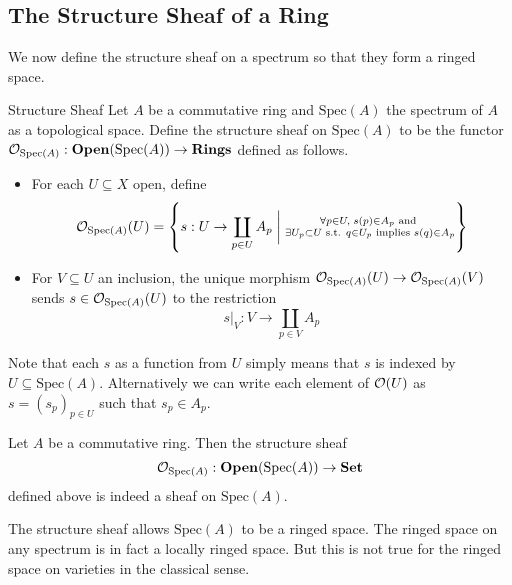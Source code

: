\documentclass[a4paper]{article}
\begin{document}
\subsection{The Structure Sheaf of a Ring}
We now define the structure sheaf on a spectrum so that they form a ringed space. 

\begin{defn}{Structure Sheaf}{} Let $A$ be a commutative ring and $\text{Spec}(A)$ the spectrum of $A$ as a topological space. Define the structure sheaf on $\text{Spec}(A)$ to be the functor $\mathcal{O}_{\text{Spec}(A)}:\bold{Open}(\text{Spec}(A))\to\bold{Rings}$ defined as follows. 
\begin{itemize}
\item For each $U\subseteq X$ open, define $$\mathcal{O}_{\text{Spec}(A)}(U)=\left\{s:U\to\coprod_{p\in U}A_p\;\bigg{|}\;\substack{\forall p\in U,\;s(p)\in A_p\text{ and }\\\exists U_p\subset U\text{ s.t. }q\in U_p\text{ implies }s(q)\in A_p}\right\}$$
\item For $V\subseteq U$ an inclusion, the unique morphism $\mathcal{O}_{\text{Spec}(A)}(U)\to\mathcal{O}_{\text{Spec}(A)}(V)$ sends $s\in\mathcal{O}_{\text{Spec}(A)}(U)$ to the restriction $$s|_V:V\to\coprod_{p\in V}A_p$$
\end{itemize}
\end{defn}

Note that each $s$ as a function from $U$ simply means that $s$ is indexed by $U\subseteq\text{Spec}(A)$. Alternatively we can write each element of $\mathcal{O}(U)$ as $s=(s_p)_{p\in U}$ such that $s_p\in A_p$. 

\begin{thm}{}{} Let $A$ be a commutative ring. Then the structure sheaf $$\mathcal{O}_{\text{Spec}(A)}:\bold{Open}(\text{Spec}(A))\to\bold{Set}$$ defined above is indeed a sheaf on $\text{Spec}(A)$. 
\end{thm}

The structure sheaf allows $\text{Spec}(A)$ to be a ringed space. The ringed space on any spectrum is in fact a locally ringed space. But this is not true for the ringed space on varieties in the classical sense. 
\end{document}
